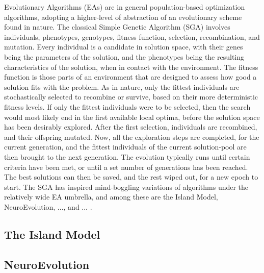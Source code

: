 Evolutionary Algorithms (EAs) are in general population-based optimization algorithms, adopting a higher-level of abstraction of an evolutionary scheme found in nature.
The classical Simple Genetic Algorithm (SGA) involves individuals, phenotypes, genotypes, fitness function, selection, recombination, and mutation.
Every individual is a candidate in solution space, with their genes being the parameters of the solution, and the phenotypes being the resulting characteristics of the solution, when in contact with the environment.
The fitness function is those parts of an environment that are designed to assess how good a solution fits with the problem.
As in nature, only the fittest individuals are stochastically selected to recombine or survive, based on their more deterministic fitness levels.
If only the fittest individuals were to be selected, then the search would most likely end in the first available local optima,
before the solution space has been desirably explored. After the first selection, individuals are recombined, and their offspring mutated.
Now, all the exploration steps are completed, for the current generation, and the fittest individuals of the current solution-pool are then brought to the next generation.
The evolution typically runs until certain criteria have been met, or until a set number of generations has been reached.
The best solutions can then be saved, and the rest wiped out, for a new epoch to start. \cite{evoalg_book}
The SGA has inspired mind-boggling variations of algorithms under the relatively wide EA umbrella, and among these are the
Island Model, NeuroEvolution, ..., and ... .

\subsection{The Island Model}

\subsection{NeuroEvolution}

